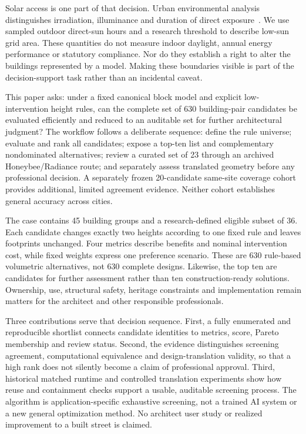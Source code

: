 \documentclass{llncs}
\begin{document}
Solar access is one part of that decision. Urban environmental analysis distinguishes irradiation, illuminance and duration of direct exposure~\cite{compagnon2004urban,czachura2022metrics}. We use sampled outdoor direct-sun hours and a research threshold to describe low-sun grid area. These quantities do not measure indoor daylight, annual energy performance or statutory compliance. Nor do they establish a right to alter the buildings represented by a model. Making these boundaries visible is part of the decision-support task rather than an incidental caveat.

This paper asks: under a fixed canonical block model and explicit low-intervention height rules, can the complete set of 630 building-pair candidates be evaluated efficiently and reduced to an auditable set for further architectural judgment? The workflow follows a deliberate sequence: define the rule universe; evaluate and rank all candidates; expose a top-ten list and complementary nondominated alternatives; review a curated set of 23 through an archived Honeybee/Radiance route; and separately assess translated geometry before any professional decision. A separately frozen 20-candidate same-site coverage cohort provides additional, limited agreement evidence. Neither cohort establishes general accuracy across cities.

The case contains 45 building groups and a research-defined eligible subset of 36. Each candidate changes exactly two heights according to one fixed rule and leaves footprints unchanged. Four metrics describe benefits and nominal intervention cost, while fixed weights express one preference scenario. These are 630 rule-based volumetric alternatives, not 630 complete designs. Likewise, the top ten are candidates for further assessment rather than ten construction-ready solutions. Ownership, use, structural safety, heritage constraints and implementation remain matters for the architect and other responsible professionals.

Three contributions serve that decision sequence. First, a fully enumerated and reproducible shortlist connects candidate identities to metrics, score, Pareto membership and review status. Second, the evidence distinguishes screening agreement, computational equivalence and design-translation validity, so that a high rank does not silently become a claim of professional approval. Third, historical matched runtime and controlled translation experiments show how reuse and containment checks support a usable, auditable screening process. The algorithm is application-specific exhaustive screening, not a trained AI system or a new general optimization method. No architect user study or realized improvement to a built street is claimed.
\end{document}
